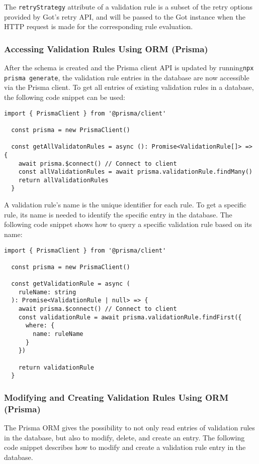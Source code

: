   The \verb;retryStrategy; attribute of a validation rule is a subset of the retry options provided by Got's retry API, and will be passed to the Got instance when the HTTP request is made for the corresponding rule evaluation. 

    \subsubsection{Accessing Validation Rules Using ORM (Prisma)} 
  After the schema is created and the Prisma client API is updated by running\newline\verb;npx prisma generate;, the validation rule entries in the database are now accessible via the Prisma client. To get all entries of existing validation rules in a database, the following code snippet can be used:

  \begin{lstlisting}[style=es6, caption={Getting all existing validation rules in the database (TypeScript)}]
  import { PrismaClient } from '@prisma/client'

  const prisma = new PrismaClient()

  const getAllValidatonRules = async (): Promise<ValidationRule[]> => {
    await prisma.$connect() // Connect to client
    const allValidationRules = await prisma.validationRule.findMany()
    return allValidationRules
  }
  \end{lstlisting}
  
  A validation rule's name is the unique identifier for each rule. To get a specific rule, its name is needed to identify the specific entry in the database. The following code snippet shows how to query a specific validation rule based on its name:

  \begin{lstlisting}[style=es6, caption={Getting an existing validation rule based on its name in the database (TypeScript)}]
  import { PrismaClient } from '@prisma/client'

  const prisma = new PrismaClient()

  const getValidationRule = async (
    ruleName: string
  ): Promise<ValidationRule | null> => {
    await prisma.$connect() // Connect to client
    const validationRule = await prisma.validationRule.findFirst({
      where: {
        name: ruleName
      }
    })
    
    return validationRule
  }
  \end{lstlisting}  

    \subsubsection{Modifying and Creating Validation Rules Using ORM (Prisma)}
  The Prisma ORM gives the possibility to not only read entries of validation rules in the database, but also to modify, delete, and create an entry. The following code snippet describes how to modify and create a validation rule entry in the database. 


